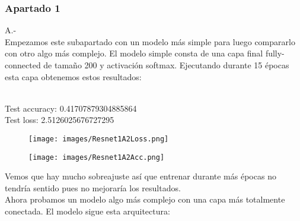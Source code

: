 \documentclass[12pt]{article}
\begin{document}
\subsubsection*{Apartado 1}
A.-\\
Empezamos este subapartado con un modelo más simple para luego compararlo con otro algo más complejo. El modelo simple consta de una capa final fully-connected de tamaño 200 y activación softmax. Ejecutando durante 15 épocas esta capa obtenemos estos resultados:\\\\
\begin{center}
Test accuracy: 0.41707879304885864\\
Test loss: 2.5126025676727295
\end{center}
\begin{figure}[H]
\centering
\parbox{8cm}{
\texttt{[image: images/Resnet1A2Loss.png]}
\caption{}
\label{fig:2figsA}}
\begin{minipage}{8cm}
\texttt{[image: images/Resnet1A2Acc.png]}
\caption{}
\label{fig:2figsB}
\end{minipage}
\end{figure}
Vemos que hay mucho sobreajuste así que entrenar durante más épocas no tendría sentido pues no mejoraría los resultados.\\
Ahora probamos un modelo algo más complejo con una capa más totalmente conectada. El modelo sigue esta arquitectura:\\
\end{document}
